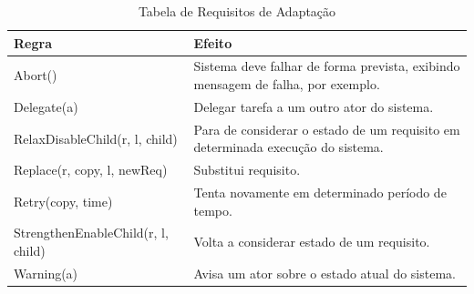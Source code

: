 \begin{table}[]
	\centering
	\caption{Tabela de Requisitos de Adaptação}
	\label{awreqs-zanshin}
	\begin{tabular}{|l|l|}
		\hline
		Regra                              & Efeito                                                                          \\ \hline
		Abort()                            & Sistema deve falhar de forma prevista, exibindo mensagem de falha, por exemplo. \\ \hline
		Delegate(a)                        & Delegar tarefa a um outro ator do sistema.                                      \\ \hline
		RelaxDisableChild(r, l, child)     & Para de considerar o estado de um requisito em determinada execução do sistema. \\ \hline
		Replace(r, copy, l, newReq)        & Substitui requisito.                                                            \\ \hline
		Retry(copy, time)                  & Tenta novamente em determinado período de tempo.                                \\ \hline
		StrengthenEnableChild(r, l, child) & Volta a considerar estado de um requisito.                                      \\ \hline
		Warning(a)                         & Avisa um ator sobre o estado atual do sistema.                                  \\ \hline
	\end{tabular}
\end{table}


